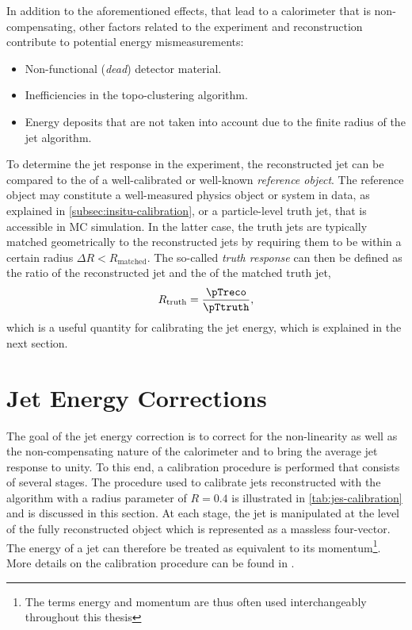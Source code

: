 In addition to the aforementioned effects, that lead to a calorimeter that is non-compensating, other factors related to the experiment and reconstruction contribute to potential energy mismeasurements:
\begin{itemize}
    \item Non-functional (\emph{dead}) detector material.
    \item Inefficiencies in the topo-clustering algorithm.
    \item Energy deposits that are not taken into account due to the finite radius of the jet algorithm.
\end{itemize}

To determine the jet response in the experiment, the reconstructed jet \pT can be compared to the \pT of a well-calibrated or well-known \emph{reference object}. The reference object may constitute a well-measured physics object or system in data, as explained in \cref{subsec:insitu-calibration}, or a particle-level truth jet, that is accessible in MC simulation.
In the latter case, the truth jets are typically matched geometrically to the reconstructed jets by requiring them to be within a certain radius $\Delta R < R_{\text{matched}}$.
The so-called \emph{truth response} can then be defined as the ratio of the reconstructed jet \pT and the \pT of the matched truth jet,
\begin{equation}
    R_{\text{truth}} =  \frac{\pTreco}{\pTtruth},
\end{equation}
which is a useful quantity for calibrating the jet energy, which is explained in the next section.


\section{Jet Energy Corrections}
\label{sec:jes-calibration}
The goal of the jet energy correction is to correct for the non-linearity as well as the non-compensating nature of the calorimeter and to bring the average jet response to unity.
To this end, a calibration procedure is performed that consists of several stages. The procedure used to calibrate jets reconstructed with the \antikt algorithm with a radius parameter of $R = 0.4$ is illustrated in \cref{tab:jes-calibration} and is discussed in this section. At each stage, the jet is manipulated at the level of the fully reconstructed object which is represented as a massless four-vector. The energy of a jet can therefore be treated as equivalent to its momentum\footnote{The terms energy and momentum are thus often used interchangeably throughout this thesis}. More details on the calibration procedure can be found in .

